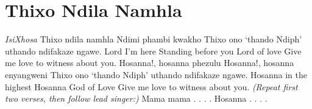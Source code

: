 \starttocol
\chapter{Thixo Ndila Namhla}
\nexttocol
\hfill{\it IsiXhosa}
\stoptocol
\starttocol
\startlines
T{\sc hixo} ndila namhla
Ndimi phambi kwakho
Thixo ono `thando
Ndiph' uthando ndifakaze ngawe.
\stoplines
\nexttocol
\startlines
Lord I'm here
Standing before you
Lord of love
Give me love 
\hfill to witness about you.
\stoplines
\stoptocol
\starttocol
\startlines
Hosanna!, hosanna phezulu
Hosanna!, hosanna enyangweni
Thixo ono `thando
Ndiph'  uthando ndifakaze ngawe.
\stoplines
\nexttocol
\startlines
Hosanna in the highest
Hosanna
God of Love
Give me love 
\hfill to witness about you.
\stoplines
\stoptocol
\starttocol
\startlines
{\it (Repeat first two verses, 
                  then follow lead singer:)}
Mama mama . . . .
Hosanna . . . .
\stoplines
\nexttocol
\stoptocol

